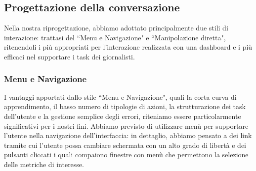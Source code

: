 \subsection{Progettazione della conversazione}
\label{ss:progettazione-conversazione}
Nella nostra riprogettazione, abbiamo adottato principalmente due stili di interazione: trattasi del ``Menu e Navigazione" e ``Manipolazione diretta", ritenendoli i più appropriati per l'interazione realizzata con una dashboard e i più efficaci nel supportare i task dei giornalisti.

\subsubsection{Menu e Navigazione}
\label{sss:menu-navigazione}
I vantaggi apportati dallo stile ``Menu e Navigazione", quali la corta curva di apprendimento, il basso numero di tipologie di azioni, la strutturazione dei task dell'utente e la gestione semplice degli errori, riteniamo essere particolarmente significativi per i nostri fini.
Abbiamo previsto di utilizzare menù per supportare l'utente nella navigazione dell'interfaccia: in dettaglio, abbiamo pensato a dei link tramite cui l'utente possa cambiare schermata con un alto grado di libertà e dei pulsanti cliccati i quali compaiono finestre con menù che permettono la selezione delle metriche di interesse. 

